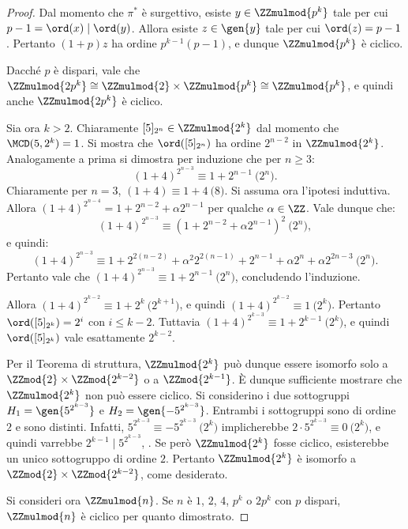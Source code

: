 \documentclass[12pt]{scrartcl}
\begin{document}
\begin{proof}
		
		Dal momento che $\pi^*$ è surgettivo, esiste $y \in \ZZmulmod{p^k}$ tale per cui $p-1 = \ord(x) \mid \ord(y)$.
		Allora esiste $z \in \gen{y}$ tale per cui $\ord(z) = p-1$.
		Pertanto $(1+p)z$ ha ordine $p^{k-1}(p-1)$, e dunque
		$\ZZmulmod{p^k}$ è ciclico. \medskip
		
		
		Dacché $p$ è dispari, vale che
		$\ZZmulmod{2p^k} \cong \ZZmulmod{2} \times
		\ZZmulmod{p^k} \cong \ZZmulmod{p^k}$, e quindi
		anche $\ZZmulmod{2p^k}$ è ciclico. \medskip
		
		
		Sia ora $k > 2$. Chiaramente $[5]_{2^n} \in
		\ZZmulmod{2^k}$ dal momento che $\MCD(5, 2^k) = 1$.
		Si mostra che $\ord([5]_{2^n})$ ha ordine
		$2^{n-2}$ in $\ZZmulmod{2^k}$. Analogamente a prima
		si dimostra per induzione che per $n \geq 3$:
		\[ (1 + 4)^{2^{n-3}} \equiv 1 + 2^{n-1} \pod{2^n}. \]
		Chiaramente per $n=3$, $(1 + 4) \equiv 1 + 4 \pod{8}$.
		Si assuma ora l'ipotesi induttiva. Allora
		$(1+4)^{2^{n-4}} = 1 + 2^{n-2} + \alpha 2^{n-1}$ per qualche
		$\alpha \in \ZZ$. Vale dunque che:
		\[ (1 + 4)^{2^{n-3}} \equiv (1 + 2^{n-2} + \alpha 2^{n-1})^2
		\pod{2^n}, \]
		e quindi:
		\[ (1 + 4)^{2^{n-3}} \equiv 1 + 2^{2(n-2)} + \alpha^2 2^{2(n-1)} + 2^{n-1} + \alpha 2^n + \alpha 2^{2n-3} \pod{2^n}. \]
		Pertanto vale che $(1 + 4)^{2^{n-3}} \equiv 1 + 2^{n-1} \pod{2^n}$, concludendo l'induzione. \medskip
		
		
		Allora $(1 + 4)^{2^{k-2}} \equiv 1 + 2^k \pod{2^{k+1}}$,
		e quindi $(1 + 4)^{2^{k-2}} \equiv 1 \pod{2^k}$. Pertanto
		$\ord([5]_{2^k}) = 2^i$ con $i \leq k-2$. Tuttavia
		$(1 + 4)^{2^{k-3}} \equiv 1 + 2^{k-1} \pod{2^k}$, e quindi
		$\ord([5]_{2^k})$ vale esattamente $2^{k-2}$. \medskip
		
		
		Per il Teorema di struttura, $\ZZmulmod{2^k}$ può
		dunque essere isomorfo solo a $\ZZmod{2} \times
		\ZZmod{2^{k-2}}$ o a $\ZZmod{2^{k-1}}$. È dunque
		sufficiente mostrare che $\ZZmulmod{2^k}$ non può
		essere ciclico. Si considerino i due sottogruppi
		$H_1 = \gen{5^{2^{k-3}}}$ e $H_2 = \gen{-5^{2^{k-3}}}$.
		Entrambi i sottogruppi sono di ordine $2$ e sono
		distinti. Infatti, $5^{2^{k-3}} \equiv -5^{2^{k-3}} \pod{2^k}$
		implicherebbe $2 \cdot 5^{2^{k-3}} \equiv 0 \pod{2^k}$, e
		quindi varrebbe $2^{k-1} \mid 5^{2^{k-3}}$, \Lightning.
		Se però $\ZZmulmod{2^k}$ fosse ciclico, esisterebbe un
		unico sottogruppo di ordine $2$. Pertanto
		$\ZZmulmod{2^k}$ è isomorfo a $\ZZmod{2} \times
		\ZZmod{2^{k-2}}$, come desiderato. \bigskip
		
		
		Si consideri ora $\ZZmulmod{n}$. Se $n$ è $1$, $2$,
		$4$, $p^k$ o $2p^k$ con $p$ dispari, $\ZZmulmod{n}$ è
		ciclico per quanto dimostrato. \medskip
		

\end{proof}
\end{document}
